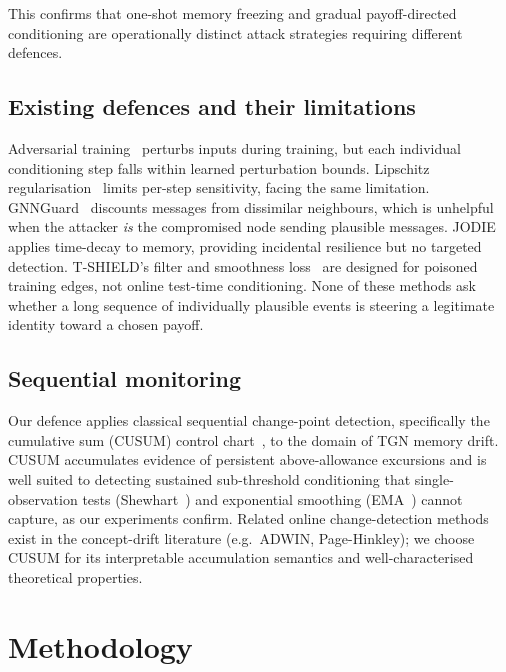 \documentclass[10pt,twocolumn]{article}
\begin{document}
This confirms that one-shot memory freezing and gradual payoff-directed
conditioning are operationally distinct attack strategies requiring
different defences.

\subsection{Existing defences and their limitations}

Adversarial training~\cite{madry2018robust} perturbs inputs during training,
but each individual conditioning step falls within learned perturbation
bounds.  Lipschitz regularisation~\cite{jia2023lipschitz} limits per-step
sensitivity, facing the same limitation.
GNNGuard~\cite{zhang2020gnnguard} discounts messages from dissimilar
neighbours, which is unhelpful when the attacker \emph{is} the compromised
node sending plausible messages.  JODIE~\cite{kumar2019jodie} applies
time-decay to memory, providing incidental resilience but no targeted
detection.  T-SHIELD's filter and smoothness loss~\cite{lee2024spear}
are designed for poisoned training edges, not online test-time conditioning.
None of these methods ask whether a long sequence of individually plausible
events is steering a legitimate identity toward a chosen payoff.

\subsection{Sequential monitoring}

Our defence applies classical sequential change-point detection, specifically
the cumulative sum (CUSUM) control chart~\cite{page1954cusum,basseville1993abrupt}, to the
domain of TGN memory drift.  CUSUM accumulates evidence of persistent
above-allowance excursions and is well suited to detecting sustained
sub-threshold conditioning that single-observation tests
(Shewhart~\cite{shewhart1931}) and
exponential smoothing (EMA~\cite{roberts1959ewma}) cannot capture, as our
experiments confirm.  Related online change-detection methods exist in
the concept-drift literature (e.g.\ ADWIN, Page-Hinkley); we choose
CUSUM for its interpretable accumulation semantics and well-characterised
theoretical properties.

\section{Methodology}
\label{sec:method}
\end{document}
